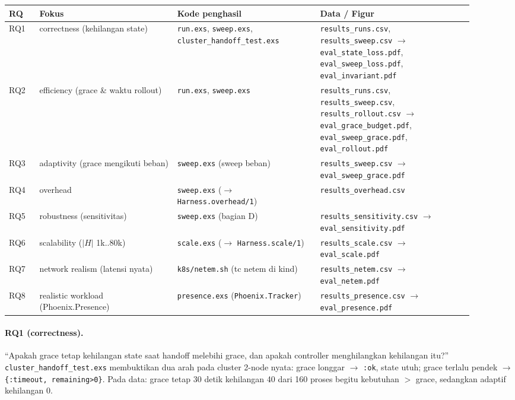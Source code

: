 \documentclass[11pt]{article}
\newcommand{\code}[1]{\texttt{\small #1}}
\begin{document}
\begin{longtable}{@{}p{0.06\linewidth} p{0.27\linewidth} p{0.28\linewidth} p{0.30\linewidth}@{}}
\toprule
\textbf{RQ} & \textbf{Fokus} & \textbf{Kode penghasil} & \textbf{Data / Figur} \\
\midrule
\endhead
RQ1 & correctness (kehilangan state) & \code{run.exs}, \code{sweep.exs}, \code{cluster\_handoff\_test.exs} & \code{results\_runs.csv}, \code{results\_sweep.csv} $\rightarrow$ \code{eval\_state\_loss.pdf}, \code{eval\_sweep\_loss.pdf}, \code{eval\_invariant.pdf} \\
RQ2 & efficiency (grace \& waktu rollout) & \code{run.exs}, \code{sweep.exs} & \code{results\_runs.csv}, \code{results\_sweep.csv}, \code{results\_rollout.csv} $\rightarrow$ \code{eval\_grace\_budget.pdf}, \code{eval\_sweep\_grace.pdf}, \code{eval\_rollout.pdf} \\
RQ3 & adaptivity (grace mengikuti beban) & \code{sweep.exs} (sweep beban) & \code{results\_sweep.csv} $\rightarrow$ \code{eval\_sweep\_grace.pdf} \\
RQ4 & overhead & \code{sweep.exs} ($\rightarrow$ \code{Harness.overhead/1}) & \code{results\_overhead.csv} \\
RQ5 & robustness (sensitivitas) & \code{sweep.exs} (bagian D) & \code{results\_sensitivity.csv} $\rightarrow$ \code{eval\_sensitivity.pdf} \\
RQ6 & scalability ($|H|$ 1k..80k) & \code{scale.exs} ($\rightarrow$ \code{Harness.scale/1}) & \code{results\_scale.csv} $\rightarrow$ \code{eval\_scale.pdf} \\
RQ7 & network realism (latensi nyata) & \code{k8s/netem.sh} (tc netem di kind) & \code{results\_netem.csv} $\rightarrow$ \code{eval\_netem.pdf} \\
RQ8 & realistic workload (Phoenix.Presence) & \code{presence.exs} (\code{Phoenix.Tracker}) & \code{results\_presence.csv} $\rightarrow$ \code{eval\_presence.pdf} \\
\bottomrule
\end{longtable}

\paragraph{RQ1 (correctness).} ``Apakah grace tetap kehilangan state saat handoff melebihi grace, dan
apakah controller menghilangkan kehilangan itu?'' \code{cluster\_handoff\_test.exs} membuktikan dua
arah pada cluster 2-node nyata: grace longgar $\rightarrow$ \code{:ok}, state utuh; grace terlalu
pendek $\rightarrow$ \code{\{:timeout, remaining>0\}}. Pada data: grace tetap 30 detik kehilangan
40 dari 160 proses begitu kebutuhan $>$ grace, sedangkan adaptif kehilangan 0.
\end{document}
